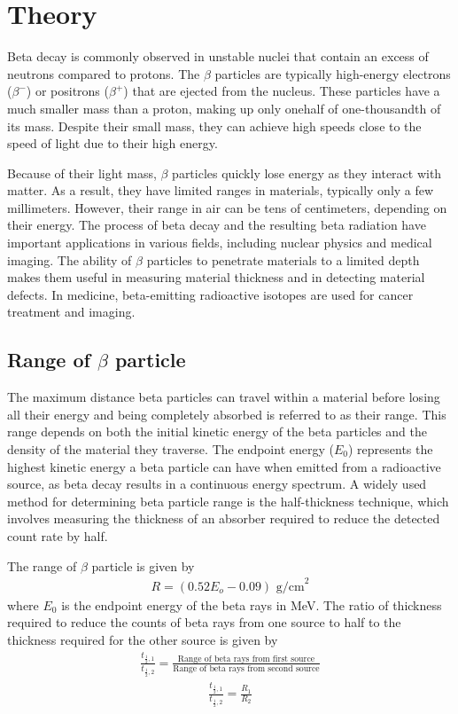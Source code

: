 \section{Theory}
Beta decay is commonly observed in unstable nuclei that contain an excess of neutrons compared to protons. The $\beta$ particles are typically high-energy electrons ($\beta^-$) or positrons  ($\beta^+$) that are ejected from the nucleus. These particles have a much smaller mass than a proton, making up only onehalf of one-thousandth of its mass. Despite their small mass, they can achieve high speeds close to the speed of light due to their high energy.

Because of their light mass, $\beta$ particles quickly lose energy as they interact with matter. As a result, they have limited ranges in materials, typically only a few millimeters. However, their range in air can be tens of centimeters, depending on their energy. The process of beta decay and the resulting beta radiation have important applications in various fields, including nuclear physics and medical imaging. The ability of $\beta$ particles to penetrate materials to a limited depth makes them useful in measuring material thickness and in detecting material defects. In medicine, beta-emitting radioactive isotopes are used for cancer treatment and imaging.

\subsection{Range of $\beta$ particle}
The maximum distance beta particles can travel
within a material before losing all their energy and
being completely absorbed is referred to as their
range. This range depends on both the initial kinetic energy of the beta particles and the density of the material they traverse. The endpoint energy ($E_0$)
represents the highest kinetic energy a beta particle
can have when emitted from a radioactive source, as
beta decay results in a continuous energy spectrum.
A widely used method for determining beta particle
range is the half-thickness technique, which involves
measuring the thickness of an absorber required to
reduce the detected count rate by half.

The range of $\beta$ particle is given by 
\begin{align}
    R=(0.52E_o-0.09) \text{ g/cm}^2
\end{align}
where $E_0$ is the endpoint energy of the beta rays in MeV. The ratio of thickness required to reduce the counts of beta rays from one source to half to the thickness required for the other source is given by
\begin{align}
    \frac{t_{\frac{1}{2},1}}{t_{\frac{1}{2},2}}=\frac{\text{Range of beta rays from first source}}{\text{Range of beta rays from second source}}
\end{align}
\begin{align}
    \frac{t_{\frac{1}{2},1}}{t_{\frac{1}{2},2}}=\frac{R_1}{R_2}
\end{align}

